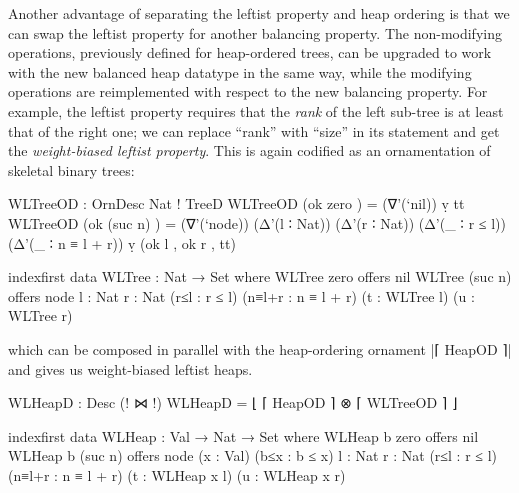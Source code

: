 Another advantage of separating the leftist property and heap ordering is that we can swap the leftist property for another balancing property.
The non-modifying operations, previously defined for heap-ordered trees, can be upgraded to work with the new balanced heap datatype in the same way, while the modifying operations are reimplemented with respect to the new balancing property.
For example, the leftist property requires that the \emph{rank} of the left sub-tree is at least that of the right one; we can replace ``rank'' with ``size'' in its statement and get the \emph{weight-biased leftist property}.
This is again codified as an ornamentation of skeletal binary trees:
\begin{code}
WLTreeOD : OrnDesc Nat ! TreeD
WLTreeOD (ok zero     )  =  (∇'(`nil)) ṿ tt
WLTreeOD (ok (suc n)  )  =  (∇'(`node)) (Δ'(l ∶ Nat)) (Δ'(r ∶ Nat))
                              (Δ'(_ ∶ r ≤ l)) (Δ'(_ ∶ n ≡ l + r)) ṿ (ok l , ok r , tt)

indexfirst data WLTree : Nat → Set where
  WLTree zero     offers   nil
  WLTree (suc n)  offers   node  {l : Nat} {r : Nat}
                                 (r≤l : r ≤ l) (n≡l+r : n ≡ l + r)
                                 (t : WLTree l) (u : WLTree r)
\end{code}
which can be composed in parallel with the heap-ordering ornament |⌈ HeapOD ⌉| and gives us weight-biased leftist heaps.
\begin{code}
WLHeapD : Desc (! ⋈ !)
WLHeapD = ⌊ ⌈ HeapOD ⌉ ⊗ ⌈ WLTreeOD ⌉ ⌋

indexfirst data WLHeap : Val → Nat → Set where
  WLHeap b zero     offers  nil
  WLHeap b (suc n)  offers  node  (x : Val) (b≤x : b ≤ x)
                                  {l : Nat} {r : Nat}
                                  (r≤l : r ≤ l) (n≡l+r : n ≡ l + r)
                                  (t : WLHeap x l) (u : WLHeap x r)
\end{code}


